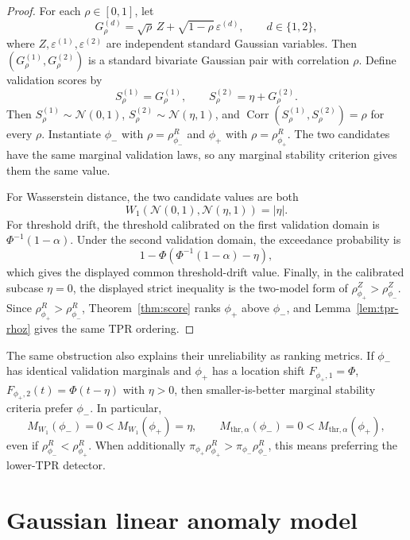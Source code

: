 \documentclass[11pt]{article}
\newcommand{\Normal}{\mathcal{N}}
\newcommand{\Corr}{\operatorname{Corr}}
\begin{document}
\begin{proof}
For each \(\rho\in[0,1]\), let
\[
    G_\rho^{(d)}
    =
    \sqrt{\rho}\,Z
    +
    \sqrt{1-\rho}\,\varepsilon^{(d)},
    \qquad d\in\{1,2\},
\]
where \(Z,\varepsilon^{(1)},\varepsilon^{(2)}\) are independent standard
Gaussian variables. Then
\((G_\rho^{(1)},G_\rho^{(2)})\) is a standard bivariate Gaussian pair with
correlation \(\rho\). Define validation scores by
\[
    S_\rho^{(1)}=G_\rho^{(1)},
    \qquad
    S_\rho^{(2)}=\eta+G_\rho^{(2)}.
\]
Then \(S_\rho^{(1)}\sim\Normal(0,1)\),
\(S_\rho^{(2)}\sim\Normal(\eta,1)\), and
\(\Corr(S_\rho^{(1)},S_\rho^{(2)})=\rho\) for every
\(\rho\). Instantiate \(\phi_-\) with \(\rho=\rho_{\phi_-}^R\) and
\(\phi_+\) with \(\rho=\rho_{\phi_+}^R\). The two candidates have the same
marginal validation laws, so any marginal stability criterion gives them the
same value.

For Wasserstein distance, the two candidate values are both
\[
    W_1(\Normal(0,1),\Normal(\eta,1))=|\eta|.
\]
For threshold drift, the threshold calibrated on the first validation domain is
\(\Phi^{-1}(1-\alpha)\). Under the second validation domain, the exceedance
probability is
\[
    1-\Phi\!\left(\Phi^{-1}(1-\alpha)-\eta\right),
\]
which gives the displayed common threshold-drift value. Finally, in the
calibrated subcase \(\eta=0\), the displayed strict inequality is the two-model
form of \(\rho_{\phi_+}^Z>\rho_{\phi_-}^Z\). Since
\(\rho_{\phi_+}^R>\rho_{\phi_-}^R\), Theorem~\ref{thm:score} ranks
\(\phi_+\) above \(\phi_-\), and Lemma~\ref{lem:tpr-rhoz} gives the same TPR
ordering.
\end{proof}

The same obstruction also explains their unreliability as ranking metrics. If
\(\phi_-\) has identical validation marginals and \(\phi_+\) has a location
shift \(F_{\phi_+,1}=\Phi\), \(F_{\phi_+,2}(t)=\Phi(t-\eta)\) with
\(\eta>0\), then smaller-is-better marginal stability criteria prefer
\(\phi_-\). In particular,
\[
    M_{W_1}(\phi_-)=0<M_{W_1}(\phi_+)=\eta,
    \qquad
    M_{\mathrm{thr},\alpha}(\phi_-)=0
    <
    M_{\mathrm{thr},\alpha}(\phi_+),
\]
even if \(\rho_{\phi_-}^R<\rho_{\phi_+}^R\). When additionally
\(\pi_{\phi_+}\rho_{\phi_+}^R>\pi_{\phi_-}\rho_{\phi_-}^R\), this means
preferring the lower-TPR detector.

\section{Gaussian linear anomaly model}
\end{document}
